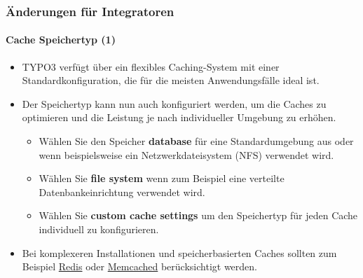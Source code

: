 \begin{frame}[fragile]
	\frametitle{Änderungen für Integratoren}
	\framesubtitle{Cache Speichertyp (1)}

	\begin{itemize}

		\item TYPO3 verfügt über ein flexibles Caching-System mit einer Standardkonfiguration,
			die für die meisten Anwendungsfälle ideal ist.
		\item Der Speichertyp kann nun auch konfiguriert werden,  um die Caches zu optimieren 
			und die Leistung je nach individueller Umgebung zu erhöhen.

			\begin{itemize}
				\item Wählen Sie den Speicher \textbf{database} für eine Standardumgebung aus
					oder wenn beispielsweise ein Netzwerkdateisystem (NFS) verwendet wird.
				\item Wählen Sie \textbf{file system} wenn zum Beispiel eine verteilte 
					Datenbankeinrichtung verwendet wird.
				\item Wählen Sie \textbf{custom cache settings} um den Speichertyp für jeden Cache 
					individuell zu konfigurieren.
			\end{itemize}

		\item Bei komplexeren Installationen und speicherbasierten Caches sollten zum Beispiel 
			\href{https://redis.io/}{Redis}
			oder
			\href{https://memcached.org/}{Memcached}
			berücksichtigt werden.

	\end{itemize}

\end{frame}


%

